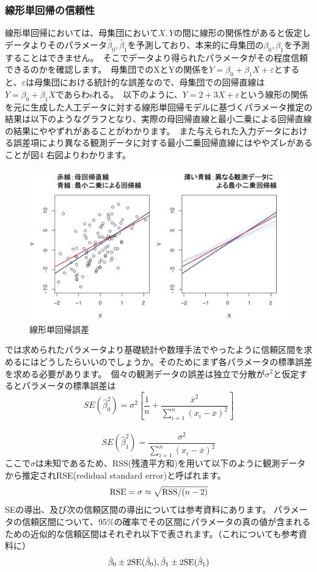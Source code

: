 \documentclass[uplatex]{jsarticle}
\begin{document}
\subsubsection{線形単回帰の信頼性}
線形単回帰においては、母集団において$X, Y$の間に線形の関係性があると仮定しデータよりそのパラメータ$\hat{\beta}_0, \hat{\beta}_1$を予測しており、本来的に母集団の$\beta_0, \beta_1$を予測することはできません。\
そこでデータより得られたパラメータがその程度信頼できるのかを確認します。\
母集団でのXとYの関係を$Y = \beta_0 + \beta_1X + \varepsilon$とすると、$\varepsilon$は母集団における統計的な誤差なので、母集団での回帰直線は$Y=\beta_0 + \beta_1X$であらわsれる。\
以下のように、$Y = 2 + 3X + \varepsilon$という線形の関係を元に生成した人工データに対する線形単回帰モデルに基づくパラメータ推定の結果は以下のようなグラフとなり、実際の母回帰直線と最小二乗による回帰直線の結果にややずれがあることがわかります。\
また与えられた入力データにおける誤差項により異なる観測データに対する最小二乗回帰直線にはややズレがあることが図4 右図よりわかります。
\begin{figure}
  \begin{center}
    \includegraphics[width=13cm]{img/lienar_error.png}
    \caption{線形単回帰誤差}
  \end{center}
\end{figure}
では求められたパラメータより基礎統計や数理手法でやったように信頼区間を求めるにはどうしたらいいのでしょうか。そのためにまず各パラメータの標準誤差を求める必要があります。\
個々の観測データの誤差は独立で分散が$\sigma ^2$と仮定するとパラメータの標準誤差は
$$SE(\hat{\beta}_0^2) = \sigma^2 \left[\frac{1}{n} + \frac{\overline{x}^2}{\sum_{i=1}^n (x_i - \overline{x})^2}\right]$$\
$$SE(\hat{\beta}_1 ^2) = \frac{\sigma^2}{\sum_{i=1}^n (x_i - \overline{x})^2}$$
ここで$\sigma$は未知であるため、{\rm RSS}(残渣平方和)を用いて以下のように観測データから推定されRSE(redidual standard error)と呼ばれます。
$${\rm RSE} = \sigma \approx \sqrt{{\rm RSS}/(n-2)}$$
SEの導出、及び次の信頼区間の導出については参考資料にあります。
パラメータの信頼区間について、95$\%$の確率でその区間にパラメータの真の値が含まれるための近似的な信頼区間はそれぞれ以下で表されます。（これについても参考資料に）
$$\hat{\beta}_0 \pm 2{\rm SE}(\hat{\beta}_0), \hat{\beta}_1 \pm 2{\rm SE}(\hat{\beta}_1)$$
\end{document}
